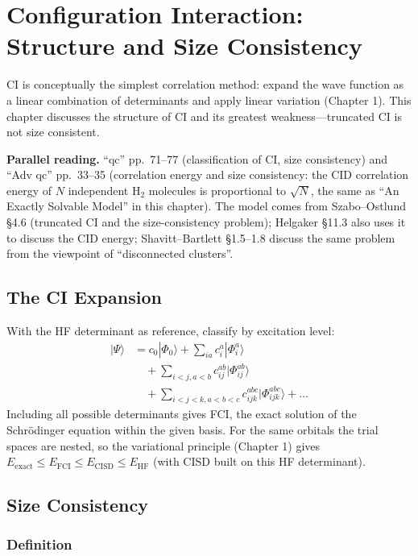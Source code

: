 \chapter{Configuration Interaction: Structure and Size Consistency}
\label{ch:ci}

CI is conceptually the simplest correlation method: expand the wave function as a linear combination of determinants and apply linear variation (Chapter 1). This chapter discusses the structure of CI and its greatest weakness---truncated CI is not size consistent.

\textbf{Parallel reading.} “qc” pp.~71--77 (classification of CI, size consistency) and “Adv qc” pp.~33--35 (correlation energy and size consistency: the CID correlation energy of $N$ independent H$_2$ molecules is proportional to $\sqrt{N}$, the same as ``An Exactly Solvable Model'' in this chapter). The model comes from Szabo--Ostlund §4.6 (truncated CI and the size-consistency problem); Helgaker §11.3 also uses it to discuss the CID energy; Shavitt--Bartlett §1.5--1.8 discuss the same problem from the viewpoint of ``disconnected clusters''.

\section{The CI Expansion}

With the HF determinant as reference, classify by excitation level:
\begin{align*}
|\Psi\rangle &= c_0 |\Phi_0\rangle + \sum_{ia} c_i^a |\Phi_i^a\rangle \\
&\quad + \sum_{i<j, a<b} c_{ij}^{ab} |\Phi_{ij}^{ab}\rangle \\
&\quad + \sum_{i<j<k, a<b<c} c_{ijk}^{abc} |\Phi_{ijk}^{abc}\rangle + \dots
\end{align*}
Including all possible determinants gives FCI, the exact solution of the Schrödinger equation within the given basis. For the same orbitals the trial spaces are nested, so the variational principle (Chapter 1) gives $E_{\text{exact}} \le E_{\text{FCI}} \le E_{\text{CISD}} \le E_{\text{HF}}$ (with CISD built on this HF determinant).

\section{Size Consistency}

\subsection{Definition}

